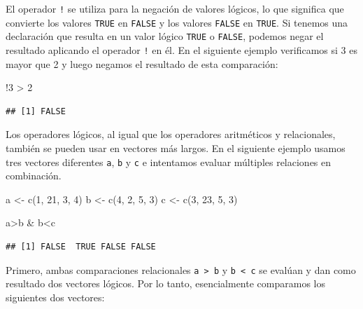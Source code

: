 \documentclass[
]{book}
\newenvironment{Shaded}{\begin{snugshade}}{\end{snugshade}}
\newcommand{\DecValTok}[1]{\textcolor[rgb]{0.00,0.00,0.81}{#1}}
\newcommand{\FunctionTok}[1]{\textcolor[rgb]{0.00,0.00,0.00}{#1}}
\newcommand{\NormalTok}[1]{#1}
\newcommand{\OtherTok}[1]{\textcolor[rgb]{0.56,0.35,0.01}{#1}}
\newcommand{\SpecialCharTok}[1]{\textcolor[rgb]{0.00,0.00,0.00}{#1}}
\begin{document}
El operador \texttt{!} se utiliza para la negación de valores lógicos, lo que significa que convierte los valores \texttt{TRUE} en \texttt{FALSE} y los valores \texttt{FALSE} en \texttt{TRUE}. Si tenemos una declaración que resulta en un valor lógico \texttt{TRUE} o \texttt{FALSE}, podemos negar el resultado aplicando el operador \texttt{!} en él. En el siguiente ejemplo verificamos si 3 es mayor que 2 y luego negamos el resultado de esta comparación:

\begin{Shaded}
\begin{Highlighting}[]
\SpecialCharTok{!}\DecValTok{3} \SpecialCharTok{\textgreater{}} \DecValTok{2}
\end{Highlighting}
\end{Shaded}

\begin{verbatim}
## [1] FALSE
\end{verbatim}

Los operadores lógicos, al igual que los operadores aritméticos y relacionales, también se pueden usar en vectores más largos. En el siguiente ejemplo usamos tres vectores diferentes \texttt{a}, \texttt{b} y \texttt{c} e intentamos evaluar múltiples relaciones en combinación.

\begin{Shaded}
\begin{Highlighting}[]
\NormalTok{a }\OtherTok{\textless{}{-}} \FunctionTok{c}\NormalTok{(}\DecValTok{1}\NormalTok{, }\DecValTok{21}\NormalTok{, }\DecValTok{3}\NormalTok{, }\DecValTok{4}\NormalTok{)}
\NormalTok{b }\OtherTok{\textless{}{-}} \FunctionTok{c}\NormalTok{(}\DecValTok{4}\NormalTok{, }\DecValTok{2}\NormalTok{, }\DecValTok{5}\NormalTok{, }\DecValTok{3}\NormalTok{)}
\NormalTok{c }\OtherTok{\textless{}{-}} \FunctionTok{c}\NormalTok{(}\DecValTok{3}\NormalTok{, }\DecValTok{23}\NormalTok{, }\DecValTok{5}\NormalTok{, }\DecValTok{3}\NormalTok{)}

\NormalTok{a}\SpecialCharTok{\textgreater{}}\NormalTok{b }\SpecialCharTok{\&}\NormalTok{ b}\SpecialCharTok{\textless{}}\NormalTok{c}
\end{Highlighting}
\end{Shaded}

\begin{verbatim}
## [1] FALSE  TRUE FALSE FALSE
\end{verbatim}

Primero, ambas comparaciones relacionales \texttt{a\ \textgreater{}\ b} y \texttt{b\ \textless{}\ c} se evalúan y dan como resultado dos vectores lógicos. Por lo tanto, esencialmente comparamos los siguientes dos vectores:
\end{document}

